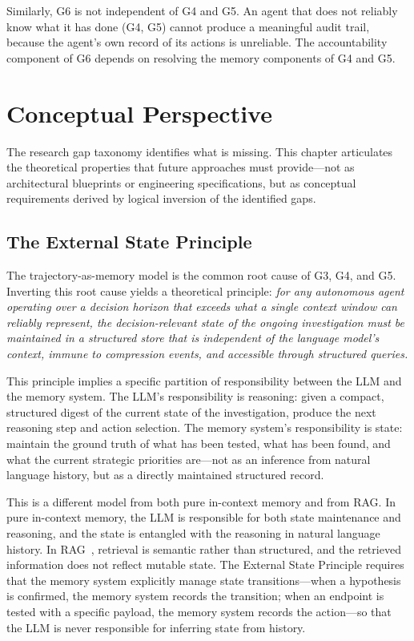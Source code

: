 \documentclass[12pt,a4paper,oneside,openany]{book}
\begin{document}
Similarly, G6 is not independent of G4 and G5. An agent that does not reliably know what it has done (G4, G5) cannot produce a meaningful audit trail, because the agent's own record of its actions is unreliable. The accountability component of G6 depends on resolving the memory components of G4 and G5.

\chapter{Conceptual Perspective}
\label{ch:conceptual}

The research gap taxonomy identifies what is missing. This chapter articulates the theoretical properties that future approaches must provide---not as architectural blueprints or engineering specifications, but as conceptual requirements derived by logical inversion of the identified gaps.

\section{The External State Principle}

The trajectory-as-memory model is the common root cause of G3, G4, and G5. Inverting this root cause yields a theoretical principle: \textit{for any autonomous agent operating over a decision horizon that exceeds what a single context window can reliably represent, the decision-relevant state of the ongoing investigation must be maintained in a structured store that is independent of the language model's context, immune to compression events, and accessible through structured queries.}

This principle implies a specific partition of responsibility between the LLM and the memory system. The LLM's responsibility is reasoning: given a compact, structured digest of the current state of the investigation, produce the next reasoning step and action selection. The memory system's responsibility is state: maintain the ground truth of what has been tested, what has been found, and what the current strategic priorities are---not as an inference from natural language history, but as a directly maintained structured record.

This is a different model from both pure in-context memory and from RAG. In pure in-context memory, the LLM is responsible for both state maintenance and reasoning, and the state is entangled with the reasoning in natural language history. In RAG~\citep{lewis2020rag}, retrieval is semantic rather than structured, and the retrieved information does not reflect mutable state. The External State Principle requires that the memory system explicitly manage state transitions---when a hypothesis is confirmed, the memory system records the transition; when an endpoint is tested with a specific payload, the memory system records the action---so that the LLM is never responsible for inferring state from history.
\end{document}
